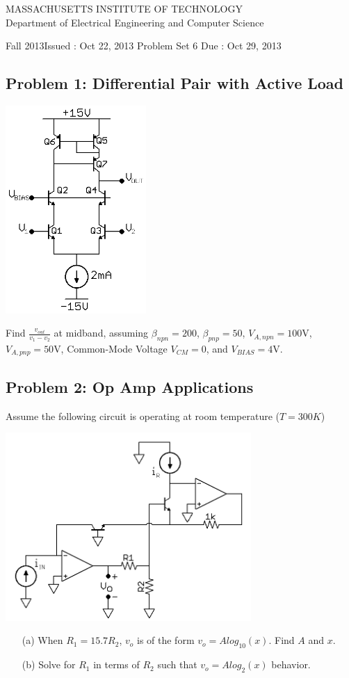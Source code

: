 \documentclass[11pt,twoside]{article}
\newlength{\toppush}
\newcommand{\htitle}[3]{\begin{center}
\vspace*{-\toppush}
{\large MASSACHUSETTS INSTITUTE OF TECHNOLOGY}\\
{\small Department of Electrical Engineering and Computer Science}\\
\vspace*{1ex}{\Large #2}\end{center}
\noindent
\newline\parbox{6.5in}
{Fall 2013\hfill Issued : #1 \newline
 Problem Set 6 \hfill Due : #3\newline
}}
\newcommand{\handout}[3]{\thispagestyle{empty}
\pagestyle{myheadings}\htitle{#1}{#2}{#3}}
\begin{document}
\handout{Oct 22, 2013}{6.301 Solid State Circuits}{Oct 29, 2013}
\setlength{\parindent}{0pt}

\newcommand{\solution}{
 \medskip
 {\bf Solution:}
}

\hrulefill

\flushleft

\subsection*{Problem 1: Differential Pair with Active Load}
\begin{center}
\includegraphics[width=0.4\textwidth]{diff-pair-mirror.png}
\end{center}
	Find $\frac{v_{out}}{v_1-v_2}$ at midband, assuming $\beta_{npn}=200$, 
	$\beta_{pnp}=50$, $V_{A,npn}=100$V, $V_{A,pnp}=50$V, Common-Mode Voltage 
	$V_{CM}=0$, and $V_{BIAS}=4$V.
\clearpage
\subsection*{Problem 2: Op Amp Applications}
	Assume the following circuit is operating at room temperature ($T=300K$)
\begin{center}
\includegraphics[width=0.7\textwidth]{log-amp.png}
\end{center}
\begin{enumerate}
	\item[(a)] When $R_1=15.7R_2$, $v_o$ is of the form $v_o=A log_{10}(x)$. Find $A$ and $x$.
	\item[(b)] Solve for $R_1$ in terms of $R_2$ such that $v_o=A log_2(x)$ behavior. 
\end{enumerate}
\end{document}

